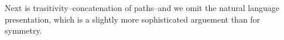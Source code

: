 \documentclass[11pt, a4paper]{article}
\begin{document}
Next is trasitivity--concatenation of paths--and we omit the natural language
presentation, which is a slightly more sophisticated arguement than for
symmetry.  


\begin{code}%
\>[0][@{}l@{\AgdaIndent{1}}]%
\>[2]\AgdaSpace{}%
\AgdaSymbol{:}\AgdaSpace{}%
\AgdaSymbol{\{}\AgdaSpace{}%
\AgdaSymbol{:}\AgdaSpace{}%
\AgdaSymbol{\}}\AgdaSpace{}%
\AgdaSpace{}%
\AgdaSymbol{\{}\AgdaSpace{}%
\AgdaSpace{}%
\AgdaSymbol{:}\AgdaSpace{}%
\AgdaSymbol{\}}\AgdaSpace{}%
\AgdaSpace{}%
\AgdaSymbol{(}\AgdaSpace{}%
\AgdaSymbol{:}\AgdaSpace{}%
\AgdaSpace{}%
\AgdaSpace{}%
\AgdaSymbol{)}\AgdaSpace{}%
\AgdaSpace{}%
\AgdaSymbol{\{}\AgdaSpace{}%
\AgdaSymbol{:}\AgdaSpace{}%
\AgdaSymbol{\}}\AgdaSpace{}%
\AgdaSpace{}%
\AgdaSymbol{(}\AgdaSpace{}%
\AgdaSymbol{:}\AgdaSpace{}%
\AgdaSpace{}%
\AgdaSpace{}%
\AgdaSymbol{)}\AgdaSpace{}%
\AgdaSpace{}%
\AgdaSpace{}%
\AgdaSpace{}%
\<%
\\
%
\>[2]%
\>[430I]\AgdaSymbol{\{}\AgdaSymbol{\}}\AgdaSpace{}%
\AgdaSymbol{\{}\AgdaSymbol{\}}\AgdaSpace{}%
\AgdaSymbol{\{}\AgdaSymbol{\}}\AgdaSpace{}%
\AgdaSpace{}%
\AgdaSymbol{\{}\AgdaSymbol{\}}\AgdaSpace{}%
\AgdaSpace{}%
\AgdaSymbol{=}\AgdaSpace{}%
\AgdaSpace{}%
\AgdaSpace{}%
\AgdaSpace{}%
\AgdaSpace{}%
\AgdaSpace{}%
\AgdaSpace{}%
\AgdaSpace{}%
\<%
\\
\>[.][@{}l@{}]\<[430I]%
\>[6]\<%
\\
%
\>[6]\AgdaSpace{}%
\AgdaSymbol{:}\AgdaSpace{}%
\AgdaSymbol{(}\AgdaSpace{}%
\AgdaSpace{}%
\AgdaSymbol{:}\AgdaSpace{}%
\AgdaSymbol{)}\AgdaSpace{}%
\AgdaSpace{}%
\AgdaSpace{}%
\AgdaSpace{}%
\AgdaSpace{}%
\AgdaSpace{}%
\<%
\\
%
\>[6]\AgdaSpace{}%

\end{code}
\end{document}
